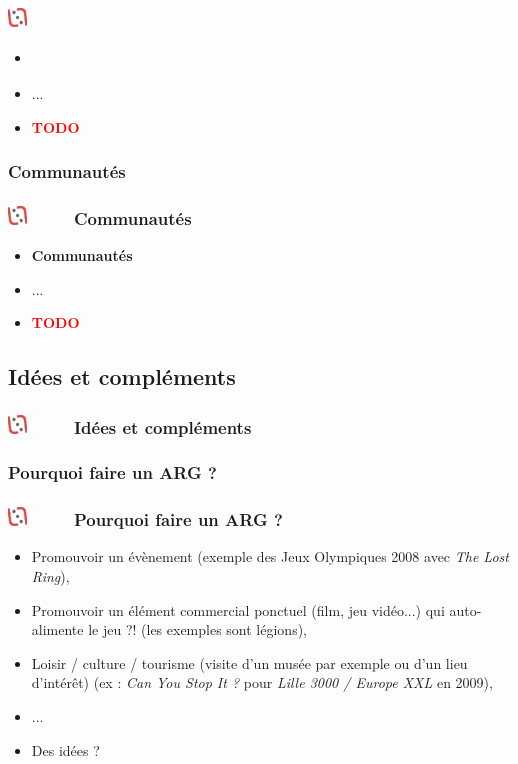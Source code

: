\documentclass[slidetop,11pt]{beamer}
\def\moreInFrameTitleLeftt{\includegraphics[height=0.5cm]{img/ligueludique-0.png}~~~~~}
\begin{document}
\subsubsection{\sectionPartIIbIV} %
\begin{frame}
	\frametitle{\moreInFrameTitleLeftt \sectionPartIIbIV }
	\begin{itemize}
		\item \textbf{ \sectionPartIIbIV }
		\item[] ...
		\item \textcolor{red}{ \textbf{TODO} }
	\end{itemize}
\end{frame} 

\def\sectionPartIIbV{Communaut{\'e}s}
\subsubsection{\sectionPartIIbV} %
\begin{frame}
	\frametitle{\moreInFrameTitleLeftt \sectionPartIIbV }
	\begin{itemize}
		\item \textbf{ \sectionPartIIbV }
		\item[] ...
		\item \textcolor{red}{ \textbf{TODO} }
	\end{itemize}
\end{frame} 


\def\sectionPartIIc{Id{\'e}es et compl{\'e}ments}
\subsection{\sectionPartIIc} %
\begin{frame}
	\frametitle{\moreInFrameTitleLeftt \sectionPartIIc }
	\tableofcontents[sections=2,currentsection,subsectionstyle=show/shaded/hide]
\end{frame} 

\def\sectionPartIIcI{Pourquoi faire un ARG ?}
\subsubsection{\sectionPartIIcI} %
\begin{frame}
	\frametitle{\moreInFrameTitleLeftt \sectionPartIIcI }
	\begin{itemize}
		\item Promouvoir un {\'e}v{\`e}nement (exemple des Jeux Olympiques 2008 avec \emph{The Lost Ring}), 
		\item Promouvoir un {\'e}l{\'e}ment commercial ponctuel (film, jeu vid{\'e}o...) qui auto-alimente le jeu ?! (les exemples sont l{\'e}gions), 
		\item Loisir / culture / tourisme (visite d'un mus{\'e}e par exemple ou d'un lieu d'int{\'e}r{\^e}t) (ex : \emph{Can You Stop It ?} pour \emph{Lille 3000 / Europe XXL} en 2009), 
		\item[] ...
		\item Des id{\'e}es ?
	\end{itemize}
\end{frame} 
\end{document}

